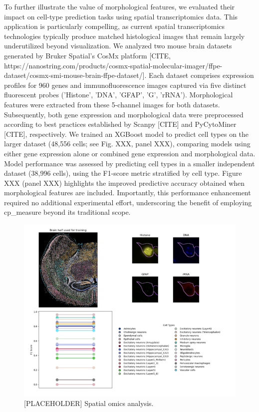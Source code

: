 \documentclass{article}
\begin{document}
To further illustrate the value of morphological features, we evaluated their impact on cell-type prediction tasks using spatial transcriptomics data. This application is particularly compelling, as current spatial transcriptomics technologies typically produce matched histological images that remain largely underutilized beyond visualization. We analyzed two mouse brain datasets generated by Bruker Spatial's CosMx platform [CITE, https://nanostring.com/products/cosmx-spatial-molecular-imager/ffpe-dataset/cosmx-smi-mouse-brain-ffpe-dataset/]. Each dataset comprises expression profiles for 960 genes and immunofluorescence images captured via five distinct fluorescent probes ('Histone', 'DNA', 'GFAP', 'G', 'rRNA'). Morphological features were extracted from these 5-channel images for both datasets. Subsequently, both gene expression and morphological data were preprocessed according to best practices established by Scanpy [CITE] and PyCytoMiner [CITE], respectively. We trained an XGBoost model to predict cell types on the larger dataset (48,556 cells; see Fig. XXX, panel XXX), comparing models using either gene expression alone or combined gene expression and morphological data. Model performance was assessed by predicting cell types in a smaller independent dataset (38,996 cells), using the F1-score metric stratified by cell type. Figure XXX (panel XXX) highlights the improved predictive accuracy obtained when morphological features are included. Importantly, this performance enhancement required no additional experimental effort, underscoring the benefit of employing cp\_measure beyond its traditional scope.
\begin{figure}[htbp]
\centering
\includegraphics[width=.9\linewidth]{./figs/spatial.png}
\caption{\label{fig:org722dcf5}{[}PLACEHOLDER] Spatial omics analysis.}
\end{figure}
\end{document}
